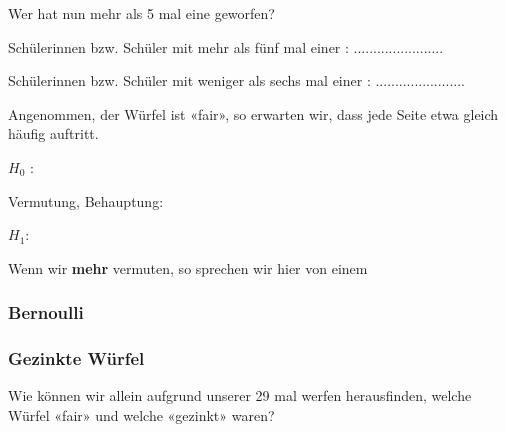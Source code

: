 Wer hat nun mehr als 5 mal eine  geworfen?

\vspace{3mm}

Schülerinnen bzw. Schüler mit mehr als fünf mal einer :
.......................

\vspace{3mm}

Schülerinnen bzw. Schüler mit weniger als sechs mal einer :
.......................


Angenommen, der Würfel ist «fair», so erwarten wir, dass jede Seite
etwa gleich häufig auftritt.


$H_0$ :


Vermutung, Behauptung:


$H_1$:



Wenn wir \textbf{mehr} vermuten, so sprechen wir hier von einem


\newpage

\subsubsection*{Bernoulli}\label{hypothesentest-bernoulli}


\newpage

\subsubsection*{Gezinkte Würfel}

Wie können wir allein aufgrund unserer 29 mal werfen
herausfinden, welche Würfel «fair» und welche «gezinkt» waren?

